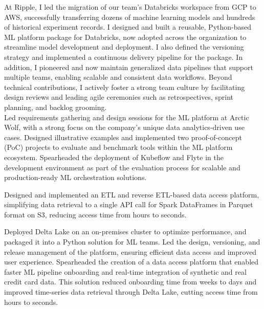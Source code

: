 \documentclass[theme]{cv_einstein}
\begin{document}
\begin{paracol}{2}
\begin{rightcolumn}
            {At Ripple, I led the migration of our team’s Databricks workspace from GCP to AWS, successfully transferring dozens of machine learning models and hundreds of historical experiment records. I designed and built a reusable, Python-based ML platform package for Databricks, now adopted across the organization to streamline model development and deployment. I also defined the versioning strategy and implemented a continuous delivery pipeline for the package. In addition, I pioneered and now maintain generalized data pipelines that support multiple teams, enabling scalable and consistent data workflows. Beyond technical contributions, I actively foster a strong team culture by facilitating design reviews and leading agile ceremonies such as retrospectives, sprint planning, and backlog grooming.}
            \vspace{\itemspace}\\
            {Led requirements gathering and design sessions for the ML platform at Arctic Wolf, with a strong focus on the company’s unique data analytics-driven use cases. Designed illustrative examples and implemented two proof-of-concept (PoC) projects to evaluate and benchmark tools within the ML platform ecosystem. Spearheaded the deployment of Kubeflow and Flyte in the development environment as part of the evaluation process for scalable and production-ready ML orchestration solutions.
}
            \vspace{\itemspace}\\
            {Designed and implemented an ETL and reverse ETL-based data access platform, simplifying data retrieval to a single API call for Spark DataFrames in Parquet format on S3, reducing access time from hours to seconds. 
            
            Deployed Delta Lake on an on-premises cluster to optimize performance, and packaged it into a Python solution for ML teams. Led the design, versioning, and release management of the platform, ensuring efficient data access and improved user experience.
Spearheaded the creation of a data access platform that enabled faster ML pipeline onboarding and real-time integration of synthetic and real credit card data. This solution reduced onboarding time from weeks to days and improved time-series data retrieval through Delta Lake, cutting access time from hours to seconds.
            
}
\end{rightcolumn}
\end{paracol}
\end{document}
